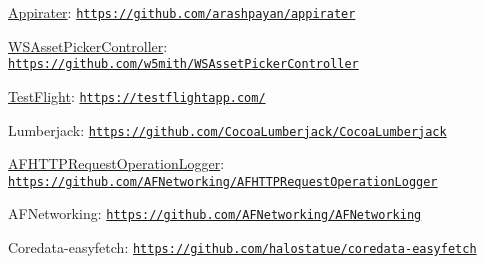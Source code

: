 \begin{DoxyItemize}
\item \hyperlink{interface_appirater}{Appirater}\-: \href{https://github.com/arashpayan/appirater}{\tt https\-://github.\-com/arashpayan/appirater}
\item \hyperlink{interface_w_s_asset_picker_controller}{W\-S\-Asset\-Picker\-Controller}\-: \href{https://github.com/w5mith/WSAssetPickerController}{\tt https\-://github.\-com/w5mith/\-W\-S\-Asset\-Picker\-Controller}
\item \hyperlink{interface_test_flight}{Test\-Flight}\-: \href{https://testflightapp.com/}{\tt https\-://testflightapp.\-com/}
\item Lumberjack\-: \href{https://github.com/CocoaLumberjack/CocoaLumberjack}{\tt https\-://github.\-com/\-Cocoa\-Lumberjack/\-Cocoa\-Lumberjack}
\item \hyperlink{interface_a_f_h_t_t_p_request_operation_logger}{A\-F\-H\-T\-T\-P\-Request\-Operation\-Logger}\-: \href{https://github.com/AFNetworking/AFHTTPRequestOperationLogger}{\tt https\-://github.\-com/\-A\-F\-Networking/\-A\-F\-H\-T\-T\-P\-Request\-Operation\-Logger}
\item A\-F\-Networking\-: \href{https://github.com/AFNetworking/AFNetworking}{\tt https\-://github.\-com/\-A\-F\-Networking/\-A\-F\-Networking}
\item Coredata-\/easyfetch\-: \href{https://github.com/halostatue/coredata-easyfetch}{\tt https\-://github.\-com/halostatue/coredata-\/easyfetch} 
\end{DoxyItemize}